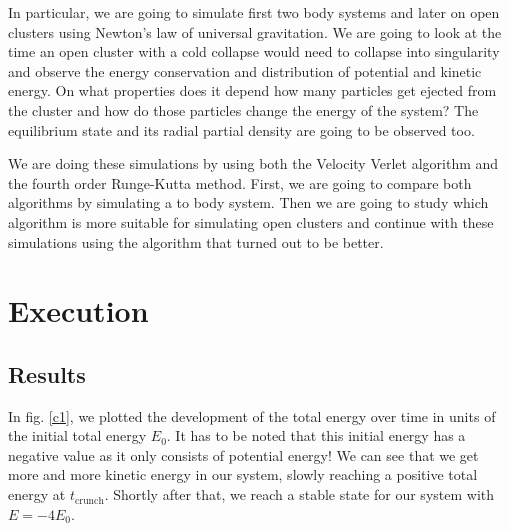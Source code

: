 \documentclass[10pt,a4paper]{article}
\begin{document}
In particular, we are going to simulate first two body systems and later on open clusters using Newton's law of universal gravitation. We are going to look at the time an open cluster with a cold collapse would need to collapse into singularity and observe the energy conservation and distribution of potential and kinetic energy. On what properties does it depend how many particles get ejected from the cluster and how do those particles change the energy of the system? The equilibrium state and its radial partial density are going to be observed too.

We are doing these simulations by using both the Velocity Verlet algorithm and the fourth order Runge-Kutta method. First, we are going to compare both algorithms by simulating a to body system. Then we are going to study which algorithm is more suitable for simulating open clusters and continue with these simulations using the algorithm that turned out to be better.

\section{Execution}
\subsection{Results}
In fig. \ref{c1}, we plotted the development of the total energy over time in units of the initial total energy $E_0$. It has to be noted that this initial energy has a negative value as it only consists of potential energy! We can see that we get more and more kinetic energy in our system, slowly reaching a positive total energy at $t_\mathrm{crunch}$. Shortly after that, we reach a stable state for our system with $E=-4E_0$.
\end{document}
